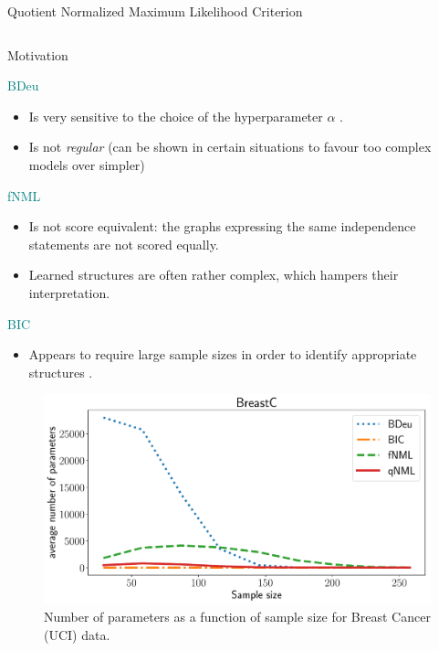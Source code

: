 \documentclass[final]{beamer}
\newcommand{\heading}[1]{\alert{\large #1}\\}
\theoremstyle{plain}
\begin{document}
\begin{frame}{}
\begin{block}{Quotient Normalized Maximum Likelihood Criterion}
\begin{columns}[T]
	\begin{column}{0.34\textwidth} %
   		\heading{Motivation}
   		\begin{minipage}{0.49\textwidth}
   			\vspace*{12pt}
		   	\textcolor{teal}{BDeu}
			\begin{itemize}	    
		    \item Is very sensitive to the choice of the hyperparameter $\alpha$ \cite{cosco.uai07}.
		    \item Is not \textit{regular} \cite{Suzuki2017} (can be shown in certain situations to favour too complex models over simpler) 
		    \end{itemize}
		    \vspace*{12pt}
		    \textcolor{teal}{fNML}
			\begin{itemize}	    
		    \item Is not score equivalent: the graphs expressing the same independence statements are not scored equally.
		    \item Learned structures are often rather complex, which hampers their interpretation.
		    \end{itemize}		    
	
   		\end{minipage}
   		\begin{minipage}{0.49\textwidth}		   
		   \phantom{why vspace* does nothing??}
		   \textcolor{teal}{BIC}
		    \begin{itemize}
		    \item Appears to
		require large sample sizes in order to identify appropriate
		structures \cite{cosco.pgm08a,Liu2012}. 
			\end{itemize}  
			
			
			\begin{figure}
		  	\includegraphics[width=\textwidth]{breast_cancer_npmean.pdf}
		  	\caption{Number of parameters as a function of sample size for Breast Cancer (UCI) data.}
		  	\end{figure}
   		

\end{minipage}
\end{column}
\end{columns}
\end{block}
\end{frame}
\end{document}
